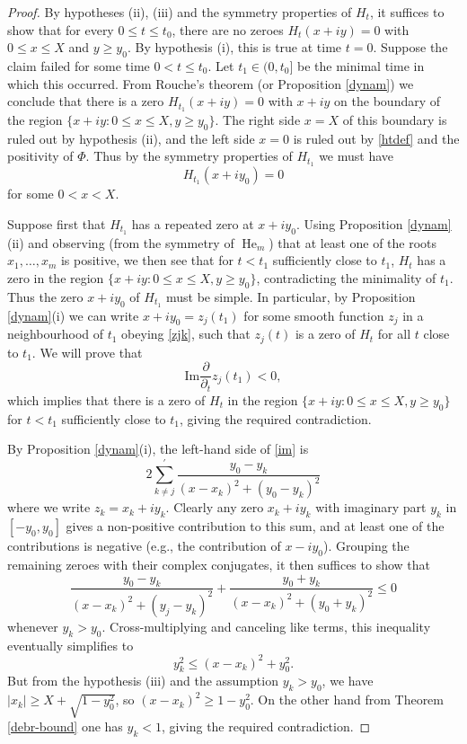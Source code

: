 \begin{proof}  By hypotheses (ii), (iii) and the symmetry properties of $H_t$, it suffices to show that for every $0 \leq t \leq t_0$, there are no zeroes $H_t(x+iy) = 0$ with $0 \leq x \leq X$ and $y \geq y_0$.  By hypothesis (i), this is true at time $t=0$.  Suppose the claim failed for some time $0 < t \leq t_0$.  Let $t_1 \in (0,t_0]$ be the minimal time in which this occurred.  From Rouche's theorem (or Proposition \ref{dynam}) we conclude that there is a zero $H_{t_1}(x+iy)=0$ with $x+iy$ on the boundary of the region $\{ x+iy: 0 \leq	 x \leq X, y \geq y_0 \}$.  The right side $x=X$ of this boundary is ruled out by hypothesis (ii), and the left side $x=0$ is ruled out by \eqref{htdef} and the positivity of $\Phi$.  Thus by the symmetry properties of $H_{t_1}$ we must have
$$ H_{t_1}(x+iy_0) = 0$$
for some $0 < x < X$.

Suppose first that $H_{t_1}$ has a repeated zero at $x+iy_0$.  Using Proposition \ref{dynam}(ii) and observing (from the symmetry of $\operatorname{He}_m$) that at least one of the roots $x_1,\dots,x_m$ is positive, we then see that for $t<t_1$ sufficiently close to $t_1$, $H_t$ has a zero in the region $\{ x+iy: 0 \leq x \leq X, y \geq y_0 \}$, contradicting the minimality of $t_1$.  Thus the zero $x+iy_0$ of $H_{t_1}$ must be simple.  In particular, by Proposition \ref{dynam}(i) we can write $x+iy_0 = z_j(t_1)$ for some smooth function $z_j$ in a neighbourhood of $t_1$ obeying \eqref{zjk}, such that $z_j(t)$ is a zero of $H_t$ for all $t$ close to $t_1$.  We will prove that
\begin{equation}\label{im}
\mathrm{Im} \frac{\partial}{\partial_t} z_j( t_1 ) < 0,
\end{equation}
which implies that there is a zero of $H_t$ in the region $\{ x+iy: 0 \leq x \leq X, y \geq y_0 \}$  for $t<t_1$ sufficiently close to $t_1$, giving the required contradiction.  

By Proposition \ref{dynam}(i), the left-hand side of \eqref{im} is
$$ 2 \sum_{k \neq j}^{\prime} \frac{y_0 - y_k}{(x-x_k)^2 + (y_0-y_k)^2}$$
where we write $z_k = x_k + i y_k$.  Clearly any zero $x_k+iy_k$ with imaginary part $y_k$ in $[-y_0,y_0]$ gives a non-positive contribution to this sum, and at least one of the contributions is negative (e.g., the contribution of $x - iy_0$).  Grouping the remaining zeroes with their complex conjugates, it then suffices to show that
$$ \frac{y_0 - y_k}{(x-x_k)^2 + (y_j-y_k)^2} + \frac{y_0 + y_k}{(x-x_k)^2 + (y_0+y_k)^2} \leq 0$$
whenever $y_k > y_0$.  Cross-multiplying and canceling like terms, this inequality eventually simplifies to
$$ y_k^2 \leq (x-x_k)^2 + y_0^2.$$
But from the hypothesis (iii) and the assumption $y_k > y_0$, we have $|x_k| \geq X+\sqrt{1-y_0^2}$, so $(x-x_k)^2 \geq 1-y_0^2$.  On the other hand from Theorem \ref{debr-bound} one has $y_k < 1$, giving the required contradiction.
\end{proof}
